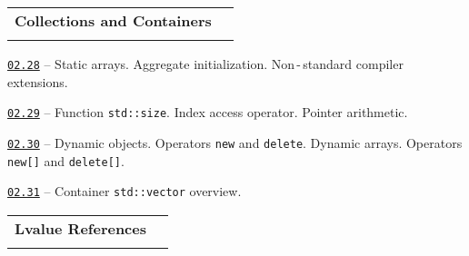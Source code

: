 \documentclass[a4paper,12pt]{article}
\renewenvironment{itemize}
{
    \begin{list}{\labelitemi}
    {
      \setlength{\topsep}{0pt}
      \setlength{\partopsep}{0pt}
      \setlength{\parskip}{0pt}
      \setlength{\itemsep}{0pt}
      \setlength{\parsep}{0pt}
      \setlength{\leftmargin}{14.5pt}
    }
}{\end{list}}
\begin{document}
\bigskip\medskip

\begin{tabular}{!{\vrule width 1pt}L{5.3cm}!{\vrule width 1pt}L{13.7cm}!{\vrule width 0pt}} 


\textbf{Collections and Containers} & \\


\end{tabular}

\medskip\smallskip

\begin{itemize}

    \item \href{https://github.com/i-s-m-mipt/Education/blob/master/projects/examples/source/02.28.cpp}{\texttt{02.28}} -- Static arrays. Aggregate initialization. Non\,-\,standard compiler extensions.

    \smallskip

    \item \href{https://github.com/i-s-m-mipt/Education/blob/master/projects/examples/source/02.29.cpp}{\texttt{02.29}} -- Function \lstinline{std::size}. Index access operator. Pointer arithmetic.

    \smallskip

    \item \href{https://github.com/i-s-m-mipt/Education/blob/master/projects/examples/source/02.30.cpp}{\texttt{02.30}} -- Dynamic objects. Operators \lstinline{new} and \lstinline{delete}. Dynamic arrays. Operators \lstinline{new[]} and \lstinline{delete[]}.

    \smallskip

    \item \href{https://github.com/i-s-m-mipt/Education/blob/master/projects/examples/source/02.31.cpp}{\texttt{02.31}} -- Container \lstinline{std::vector} overview.

\end{itemize}

\bigskip\medskip

\begin{tabular}{!{\vrule width 1pt}L{3.6cm}!{\vrule width 1pt}L{15.4cm}!{\vrule width 0pt}} 


\textbf{Lvalue References} & \\


\end{tabular}
\end{document}
